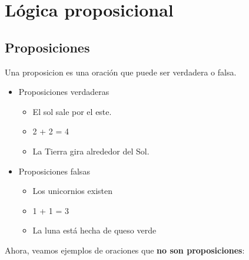 \section{Lógica proposicional}
\subsection{Proposiciones}
\vspace{1em}
\begin{fmd-definition}[Proposición] 
	Una \gls{proposicion} es una oración que puede ser verdadera o falsa.
\end{fmd-definition}

\begin{fmd-example}
	\begin{itemize}
		\item Proposiciones verdaderas
		\begin{itemize}
			\item El sol sale por el este.
			\item 2 + 2 = 4
			\item La Tierra gira alrededor del Sol.
		\end{itemize}
		
		\item Proposiciones falsas
		\begin{itemize}
			\item Los unicornios existen
			\item 1 + 1 = 3
			\item La luna está hecha de queso verde
		\end{itemize}
	\end{itemize}
\end{fmd-example}

Ahora, veamos ejemplos de oraciones que \textbf{no son proposiciones}:

